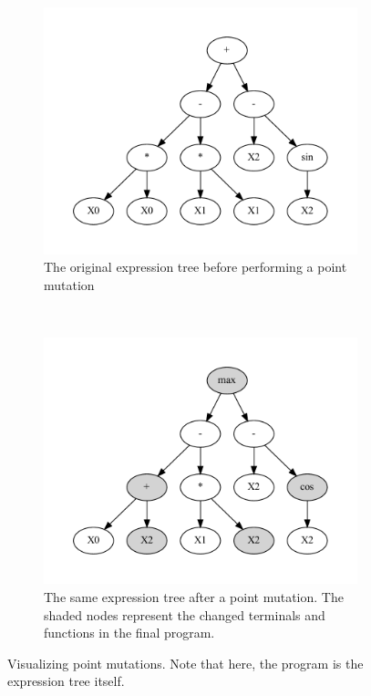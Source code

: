 \begin{figure}[htp]
  \centering
  \begin{subfigure}{\textwidth}
    \centering
    \includegraphics[scale=0.8]{images/graphviz/point_mut_before.dot.pdf}
    \caption{The original expression tree before performing a point mutation}
    \label{fig:point_muta}
  \end{subfigure}%
  \\
  \begin{subfigure}{\textwidth}
    \centering
    \includegraphics[scale=0.8]{images/graphviz/point_mut_after.dot.pdf}
    \caption{The same expression tree after a point mutation. The shaded nodes represent the changed terminals and functions in the final program.}
    \label{fig:point_mutb}
  \end{subfigure}
  \caption{Visualizing point mutations. Note that here, the program is the expression tree itself. }
  
  \label{fig:point}
\end{figure}

